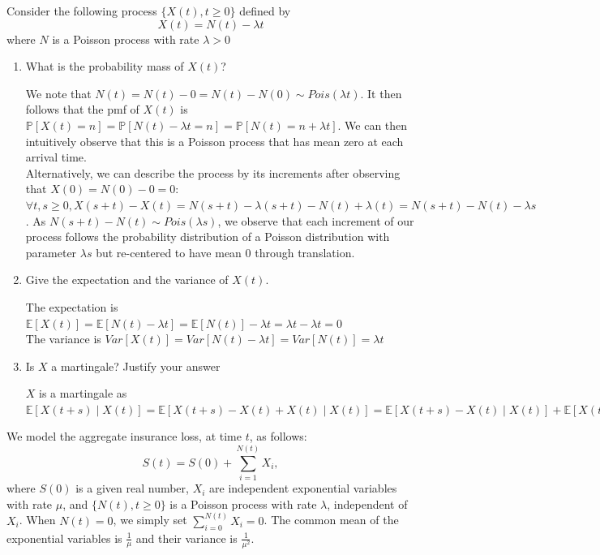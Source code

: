 \documentclass[12pt,twoside, letter]{exam}
\theoremstyle{definition}
\newcommand{\ee}{\mathbb{E}}
\newcommand{\pp}{\mathbb{P}}
\begin{document}
\par{ Consider the following process $\{X(t), t\geq 0\}$ defined by}
  \begin{equation*}
    X(t) = N(t) - \lambda t
  \end{equation*}
where $N$ is a Poisson process with rate $\lambda > 0$
  \begin{enumerate}
    \item What is the probability mass of $X(t)$?
      \begin{solution}
        We note that $N(t) = N(t) - 0 = N(t) - N(0) \sim Pois(\lambda t)$. It then follows that the pmf of $X(t)$ is
        $\pp[X(t) = n] = \pp[N(t) - \lambda t = n] = \pp[N(t) = n + \lambda t]$. We can then intuitively observe that
        this is a Poisson process that has mean zero at each arrival time. \\
        Alternatively, we can describe the process by its increments after observing that $X(0) = N(0) - 0 = 0$:
        $\forall t,s \geq 0, X(s+t) - X(t) = N(s+t) - \lambda(s+t) - N(t) + \lambda(t) = N(s+t) - N(t) - \lambda s$.
        As $N(s+t) - N(t) \sim Pois(\lambda s)$, we observe that each increment of our process follows the probability
        distribution of a Poisson distribution with parameter $\lambda s$ but re-centered to have mean 0 through translation. 
      \end{solution}
    \item Give the expectation and the variance of $X(t)$.
      \begin{solution}
        The expectation is $\ee[X(t)] = \ee[N(t) - \lambda t] = \ee[N(t)] - \lambda t = \lambda t - \lambda t = 0 $\\
        The variance is $Var[X(t)] = Var[N(t) - \lambda t] = Var[N(t)] = \lambda t$
      \end{solution}
    \item Is $X$ a martingale? Justify your answer
      \begin{solution}
        $X$ is a martingale as $\ee[X(t+s) \mid X(t)] = \ee[X(t+s) - X(t) + X(t) \mid X(t)]
        = \ee[X(t+s) - X(t) \mid X(t)] + \ee[X(t)\mid X(t)] = \ee[N(t+s) - \lambda (t+s) - N(s) + \lambda (s) \mid X(t)] + X(t)
        = \ee[N(t+s) - N(s) - \lambda s \mid X(t)] + X(t) = \lambda s - \lambda s + X(t) = X(t)$
      \end{solution}
  \end{enumerate}

 We model the aggregate insurance loss, at time $t$, as follows:
  \begin{equation*}
    S(t) = S(0) + \sum^{N(t)}_{i=1} X_{i},
  \end{equation*}
  where $S(0)$ is a given real number, $X_{i}$ are independent exponential variables with rate $\mu$, and
  $\{N(t), t \geq 0\}$ is a Poisson process with rate $\lambda$, independent of $X_{i}$. When $N(t) = 0$, we simply
  set $\sum^{N(t)}_{i=0} X_{i} = 0$. The common mean of the exponential variables is $\frac{1}{\mu}$ and their variance is $\frac{1}{\mu^2}$.
\end{document}
